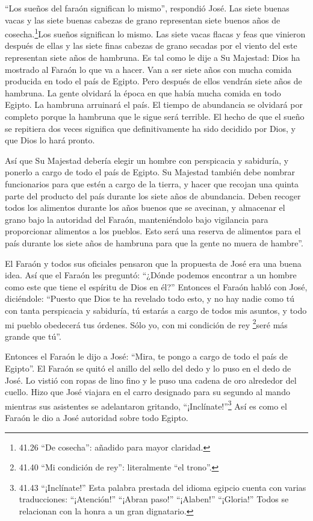  ``Los sueños del faraón significan lo mismo'', respondió
José.  Las siete buenas vacas y las siete buenas cabezas de
grano representan siete buenos años de cosecha.\footnote{41.26 ``De
  cosecha'': añadido para mayor claridad.}Los sueños significan lo
mismo.  Las siete vacas flacas y feas que vinieron después
de ellas y las siete finas cabezas de grano secadas por el viento del
este representan siete años de hambruna.  Es tal como le
dije a Su Majestad: Dios ha mostrado al Faraón lo que va a hacer.
 Van a ser siete años con mucha comida producida en todo el
país de Egipto.  Pero después de ellos vendrán siete años
de hambruna. La gente olvidará la época en que había mucha comida en
todo Egipto. La hambruna arruinará el país.  El tiempo de
abundancia se olvidará por completo porque la hambruna que le sigue será
terrible.  El hecho de que el sueño se repitiera dos veces
significa que definitivamente ha sido decidido por Dios, y que Dios lo
hará pronto.

 Así que Su Majestad debería elegir un hombre con
perspicacia y sabiduría, y ponerlo a cargo de todo el país de Egipto.
 Su Majestad también debe nombrar funcionarios para que
estén a cargo de la tierra, y hacer que recojan una quinta parte del
producto del país durante los siete años de abundancia. 
Deben recoger todos los alimentos durante los años buenos que se
avecinan, y almacenar el grano bajo la autoridad del Faraón,
manteniéndolo bajo vigilancia para proporcionar alimentos a los pueblos.
 Esto será una reserva de alimentos para el país durante
los siete años de hambruna para que la gente no muera de hambre''.

 El Faraón y todos sus oficiales pensaron que la propuesta
de José era una buena idea.  Así que el Faraón les
preguntó: ``¿Dónde podemos encontrar a un hombre como este que tiene el
espíritu de Dios en él?''  Entonces el Faraón habló con
José, diciéndole: ``Puesto que Dios te ha revelado todo esto, y no hay
nadie como tú con tanta perspicacia y sabiduría,  tú
estarás a cargo de todos mis asuntos, y todo mi pueblo obedecerá tus
órdenes. Sólo yo, con mi condición de rey \footnote{41.40 ``Mi condición
  de rey'': literalmente ``el trono''.}seré más grande que tú''.

 Entonces el Faraón le dijo a José: ``Mira, te pongo a
cargo de todo el país de Egipto''.  El Faraón se quitó el
anillo del sello del dedo y lo puso en el dedo de José. Lo vistió con
ropas de lino fino y le puso una cadena de oro alrededor del cuello.
 Hizo que José viajara en el carro designado para su
segundo al mando mientras sus asistentes se adelantaron gritando,
``¡Inclínate!''\footnote{41.43 ``¡Inclínate!'' Esta palabra prestada del
  idioma egipcio cuenta con varias traducciones: ``¡Atención!'' ``¡Abran
  paso!'' ``¡Alaben!'' ``¡Gloria!'' Todos se relacionan con la honra a
  un gran dignatario.} Así es como el Faraón le dio a José autoridad
sobre todo Egipto.

